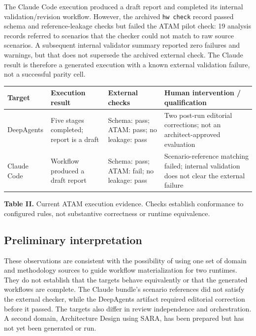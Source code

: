\documentclass[10pt,conference]{IEEEtran}
\begin{document}
The Claude Code execution produced a draft report and completed its internal validation/revision workflow. However, the archived \texttt{hw\ check} record passed schema and reference-leakage checks but failed the ATAM pilot check: 19 analysis records referred to scenarios that the checker could not match to raw source scenarios. A subsequent internal validator summary reported zero failures and warnings, but that does not supersede the archived external check. The Claude result is therefore a generated execution with a known external validation failure, not a successful parity cell.

\begin{table}[t]
\centering\footnotesize\renewcommand{\arraystretch}{1.15}
\begin{tabularx}{\textwidth}{>{\raggedright\arraybackslash}X >{\raggedright\arraybackslash}X >{\raggedright\arraybackslash}X >{\raggedright\arraybackslash}X}
\toprule
Target & Execution result & External checks & Human intervention / qualification\tabularnewline
\midrule
DeepAgents & Five stages completed; report is a draft & Schema: pass; ATAM: pass; no leakage: pass & Two post-run editorial corrections; not an architect-approved evaluation\tabularnewline
Claude Code & Workflow produced a draft report & Schema: pass; ATAM: fail; no leakage: pass & Scenario-reference matching failed; internal validation does not clear the external failure\tabularnewline
\bottomrule
\end{tabularx}
\end{table}

\textbf{Table II.} Current ATAM execution evidence. Checks establish conformance to configured rules, not substantive correctness or runtime equivalence.

\subsection{Preliminary interpretation}

These observations are consistent with the possibility of using one set of domain and methodology sources to guide workflow materialization for two runtimes. They do not establish that the targets behave equivalently or that the generated workflows are complete. The Claude bundle's scenario references did not satisfy the external checker, while the DeepAgents artifact required editorial correction before it passed. The targets also differ in review independence and orchestration. A second domain, Architecture Design using SARA, has been prepared but has not yet been generated or run.
\end{document}
